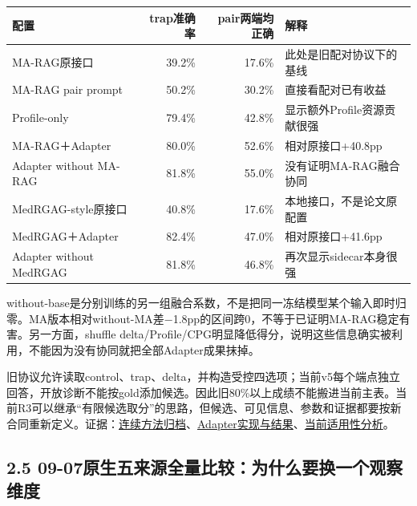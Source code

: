 \documentclass[
  11pt,
  a4paper,
]{article}
\newcounter{none} %
\begin{document}
{\def\LTcaptype{none} %
\begin{longtable}[]{@{}lrrl@{}}
\toprule\noalign{}
配置 & trap准确率 & pair两端均正确 & 解释 \\
\midrule\noalign{}
\endhead
\bottomrule\noalign{}
\endlastfoot
MA-RAG原接口 & 39.2\% & 17.6\% & 此处是旧配对协议下的基线 \\
MA-RAG pair prompt & 50.2\% & 30.2\% & 直接看配对已有收益 \\
Profile-only & 79.4\% & 42.8\% & 显示额外Profile资源贡献很强 \\
MA-RAG＋Adapter & 80.0\% & 52.6\% & 相对原接口+40.8pp \\
Adapter without MA-RAG & 81.8\% & 55.0\% & 没有证明MA-RAG融合协同 \\
MedRGAG-style原接口 & 40.8\% & 17.6\% & 本地接口，不是论文原配置 \\
MedRGAG＋Adapter & 82.4\% & 47.0\% & 相对原接口+41.6pp \\
Adapter without MedRGAG & 81.8\% & 46.8\% & 再次显示sidecar本身很强 \\
\end{longtable}
}

without-base是分别训练的另一组融合系数，不是把同一冻结模型某个输入即时归零。MA版本相对without-MA差−1.8pp的区间跨0，不等于已证明MA-RAG稳定有害。另一方面，shuffle
delta/Profile/CPG明显降低得分，说明这些信息确实被利用，不能因为没有协同就把全部Adapter成果抹掉。

旧协议允许读取control、trap、delta，并构造受控四选项；当前v5每个端点独立回答，开放诊断不能按gold添加候选。因此旧80\%以上成绩不能搬进当前主表。当前R3可以继承``有限候选取分''的思路，但候选、可见信息、参数和证据都要按新合同重新定义。证据：\href{https://github.com/xiotakut/cf_mrg/blob/main/papers/2026-10-02_cf_moa/author_dossier/records/archive/cf_method_trials.md}{连续方法归档}、\href{https://github.com/xiotakut/cf_mrg/blob/main/papers/2026-10-02_cf_moa/author_dossier/records/archive/cf_residual_adapter.md\#adapter-implementation-clarification}{Adapter实现与结果}、\href{https://github.com/xiotakut/cf_mrg/blob/main/papers/2026-10-02_cf_moa/author_dossier/records/research/optimization.md\#adapter-current-classification}{当前适用性分析}。

\subsection{2.5
09-07原生五来源全量比较：为什么要换一个观察维度}\label{ux539fux751fux4e94ux6765ux6e90ux5168ux91cfux6bd4ux8f83ux4e3aux4ec0ux4e48ux8981ux6362ux4e00ux4e2aux89c2ux5bdfux7ef4ux5ea6}
\end{document}
